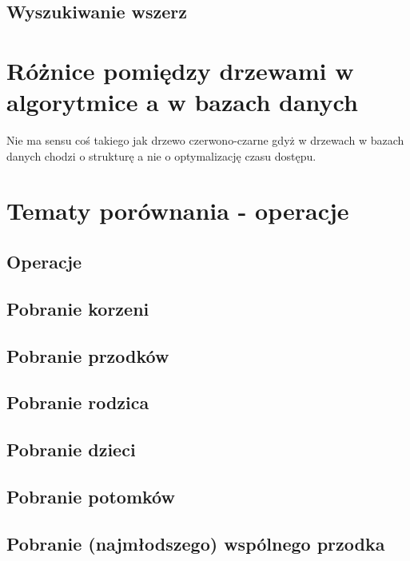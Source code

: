 \subsection{Wyszukiwanie wszerz}


\section{Różnice pomiędzy drzewami w algorytmice a w bazach danych}

Nie ma sensu coś takiego jak drzewo czerwono-czarne gdyż w drzewach w bazach danych chodzi o strukturę a nie o optymalizację czasu dostępu.

\section{Tematy porównania - operacje}



\subsection{Operacje}
\subsection{Pobranie korzeni}
\subsection{Pobranie przodków}
\subsection{Pobranie rodzica}
\subsection{Pobranie dzieci}
\subsection{Pobranie potomków}
\subsection{Pobranie (najmłodszego) wspólnego przodka}





